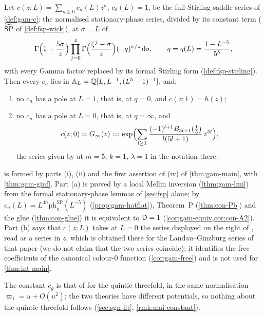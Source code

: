 \begin{thm}
\label{thm:int-gamma}
Let $c(z;L)=\sum_{n\geq0}c_n(L)z^n$, $c_0(L)=1$, be the full-Stirling saddle series of \cref{def:gam-c}: the normalised stationary-phase series, divided by its constant term ($\widehat{\mathrm{SP}}$ of \cref{def:fsp-wick}), at $\sigma=L$ of
\[
\Gamma\Bigl(1+\frac{5\sigma}{z}\Bigr)\prod_{j=0}^{4}\Gamma\Bigl(\frac{\zeta^j-\sigma}{z}\Bigr)(-q)^{\sigma/z}\,\mathrm{d}\sigma,\qquad q=q(L)=\frac{1-L^{-5}}{5^5},
\]
with every Gamma factor replaced by its formal Stirling form (\cref{def:fsp-stirling}). Then every $c_n$ lies in $\mathbb{A}_{L}=\mathbb{Q}[L,L^{-1},(L^5-1)^{-1}]$, and:
\begin{enumerate}
\item[(a)] no $c_n$ has a pole at $L=1$, that is, at $q=0$, and $c(z;1)=h(z)$;
\item[(b)] no $c_n$ has a pole at $L=0$, that is, at $q=\infty$, and
\[
c(z;0)=G_{\infty}(z):=\exp\Bigl(\sum_{l\geq1}\frac{(-1)^{l+1}B_{5l+1}(\frac15)}{l(5l+1)}\,z^{5l}\Bigr),
\]
the series given by \cite[Lemma~7.7, (37)]{GJR18} at $m=5$, $k=1$, $\lambda=1$ in the notation there.
\end{enumerate}
\end{thm}

 is formed by parts (i), (ii) and the first assertion of (iv) of \cref{thm:gam-main}, with \cref{thm:gam-ginf}. Part (a) is proved by a local Mellin inversion (\cref{thm:gam-lmi}) from the formal stationary-phase lemmas of \cref{sec:fsp} alone; by $c_n(L)=L^{4n}\mathrm{ph}^{\mathrm{SP}}_n(L^{-5})$ (\cref{prop:gam-hatflat}), Theorem~P (\cref{thm:con-Pb}) and the glue (\cref{thm:con-glue}) it is equivalent to $\mathsf{D}=1$ (\cref{cor:gam-equiv,cor:con-A2}). Part (b) says that $c(z;L)$ takes at $L=0$ the series displayed on the right of \cite[Lemma~7.7, (37)]{GJR18}, read as a series in $z$, which is obtained there for the Landau--Ginzburg series of that paper (we do not claim that the two series coincide); it identifies the free coefficients of the canonical colour-$0$ function (\cref{cor:gam-free}) and is not used for \cref{thm:int-main}.

\begin{rmk}
\label{rmk:int-constant}
The constant $c_g$ is that of \cite[Conjecture~1.5]{CGYZ26} for the quintic threefold, in the same normalisation $\varpi_1=u+O(u^2)$; the two theories have different potentials, so nothing about the quintic threefold follows (\cref{sec:sgn-lit}, \cref{rmk:mai-constant}). 
\end{rmk}


